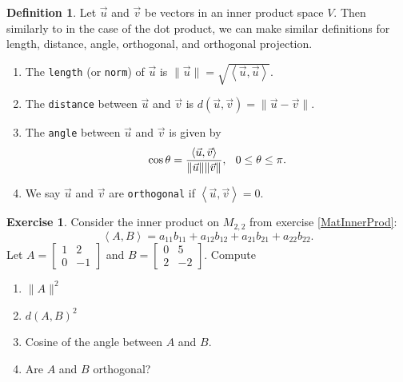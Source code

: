 \documentclass{beamer}
\newcommand{\fn}{\insertframenumber}
\newcommand{\ip}[2]{\left\langle #1,#2\right\rangle}
\theoremstyle{definition}
\newtheorem{exercise}{Exercise}
\newtheorem*{defn}{Definition}
\renewcommand{\emph}[1]{{\color{blue}\texttt{#1}}}
\begin{document}
\begin{frame}{\fn}
	\begin{defn}
		Let $\vec u$ and $\vec v$ be vectors in an inner product space $V$.  Then similarly to in the case of the dot product, we can make similar definitions for length, distance, angle, orthogonal, and orthogonal projection.
		\begin{enumerate}[label=\textbf{\arabic*.}]
			\item The \emph{length} (or \emph{norm}) of $\vec u$ is $\|\vec u\|=\sqrt{\ip{\vec u}{\vec u}}$.
			\item The \emph{distance} between $\vec u$ and $\vec v$ is $d(\vec u,\vec v)=\|\vec u-\vec v\|$.
			\item The \emph{angle} between $\vec u$ and $\vec v$ is given by
				\[\cos\theta=\frac{\ip{\vec u}{\vec v}}{\|\vec u\|\|\vec v\|},\hspace*{.1in}0\leq\theta\leq \pi.\]
			\item We say $\vec u$ and $\vec v$ are \emph{orthogonal} if $\ip{\vec u}{\vec v}=0$.
		\end{enumerate}
	\end{defn}
\end{frame}
\begin{frame}{\fn}
	\begin{exercise}
		Consider the inner product on $M_{2,2}$ from exercise \ref{MatInnerProd}:
			\[\ip{A}{B}=a_{11}b_{11}+a_{12}b_{12}+a_{21}b_{21}+a_{22}b_{22}.\]
		Let $A=\begin{bmatrix}1&2\\0&-1\end{bmatrix}$ and $B=\begin{bmatrix}0&5\\2&-2\end{bmatrix}$.
		Compute
		\begin{enumerate}[label=(\alph*)]
			\item $\|A\|^2$
			\item $d(A,B)^2$
			\item Cosine of the angle between $A$ and $B$.
			\item Are $A$ and $B$ orthogonal?
		\end{enumerate}
	\end{exercise}
\end{frame}
\end{document}
